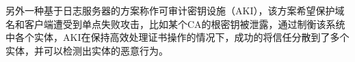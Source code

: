另外一种基于日志服务器的方案称作可审计密钥设施（AKI），该方案希望保护域名和客户端遭受到单点失败攻击，比如某个CA的根密钥被泄露，通过制衡该系统中各个实体，AKI在保持高效处理证书操作的情况下，成功的将信任分散到了多个实体，并可以检测出实体的恶意行为。





























































